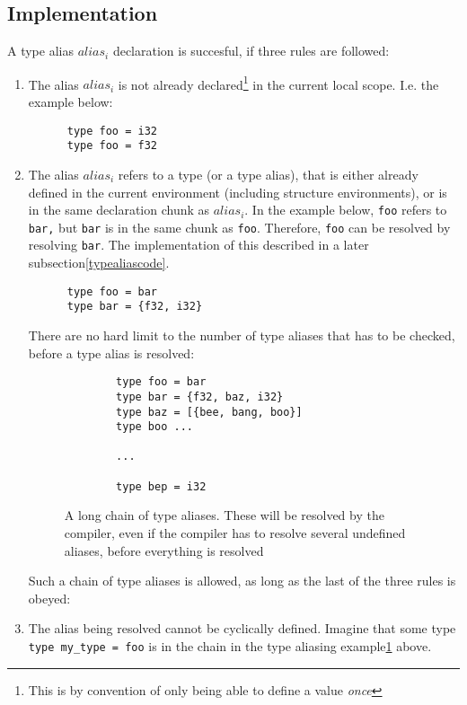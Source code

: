 \subsection{Implementation}
A type alias $alias_i$ declaration is succesful, if three rules are followed:
\begin{enumerate}
  \item The alias $alias_i$ is not already declared\footnote[]{This is by convention of
      only being able to define a value \textit{once}} in the current local
    scope. I.e. the example below:
    \begin{verbatim}
      type foo = i32
      type foo = f32
    \end{verbatim}
    
  \item The alias $alias_i$ refers to a type (or a type alias), that is either already
    defined in the current environment (including structure environments), or is
    in the same declaration chunk as $alias_i$. In the example below, \texttt{foo} refers
    to \texttt{bar,} but \texttt{bar} is in the same chunk as \texttt{foo}.
    Therefore, \texttt{foo} can be resolved by resolving \texttt{bar}. The implementation of this
    described in a later subsection\ref{typealiascode}.
    \begin{verbatim} 
      type foo = bar
      type bar = {f32, i32}
    \end{verbatim}
    There are no hard limit to the number of type aliases that has to be
    checked, before a type alias is resolved:
    \begin{figure}\label{longchain}
      \begin{verbatim} 
        type foo = bar
        type bar = {f32, baz, i32}
        type baz = [{bee, bang, boo}]
        type boo ...
  
        ...
  
        type bep = i32
        \end{verbatim}
      \caption{A long chain of type aliases. These will be resolved by the
        compiler, even if the compiler has to resolve several undefined aliases,
      before everything is resolved}
    \end{figure}
    Such a chain of type aliases is allowed, as long as the last of the three
    rules is obeyed:
  
    
  \item The alias being resolved cannot be cyclically defined.\label{cyclicaldefinitionerror}
    Imagine that some type \texttt{type my_type = foo} is in the chain in the
    type aliasing example\ref{longchain} above.\\


\end{enumerate}
